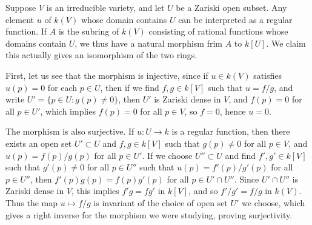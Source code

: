\begin{example}
    Suppose $V$ is an irreducible variety, and let $U$ be a Zariski open subset. Any element $u$ of $k(V)$ whose domain contains $U$ can be interpreted as a regular function. If $A$ is the subring of $k(V)$ consisting of rational functions whose domains contain $U$, we thus have a natural morphism frim $A$ to $k[U]$. We claim this actually gives an isomorphism of the two rings.

    First, let us see that the morphism is injective, since if $u \in k(V)$ satisfies $u(p) = 0$ for each $p \in U$, then if we find $f,g \in k[V]$ such that $u = f/g$, and write $U' = \{ p \in U : g(p) \neq 0 \}$, then $U'$ is Zariski dense in $V$, and $f(p) = 0$ for all $p \in U'$, which implies $f(p) = 0$ for all $p \in V$, so $f = 0$, hence $u = 0$.

    The morphism is also surjective. If $u : U \to k$ is a regular function, then there exists an open set $U' \subset U$ and $f,g \in k[V]$ such that $g(p) \neq 0$ for all $p \in V$, and $u(p) = f(p)/g(p)$ for all $p \in U'$. If we choose $U'' \subset U$ and find $f',g' \in k[V]$ such that $g'(p) \neq 0$ for all $p \in U''$ such that $u(p) = f'(p)/g'(p)$ for all $p \in U''$, then $f'(p)g(p) = f(p)g'(p)$ for all $p \in U' \cap U''$. Since $U' \cap U''$ is Zariski dense in $V$, this implies $f'g = fg'$ in $k[V]$, and so $f'/g' = f/g$ in $k(V)$. Thus the map $u \mapsto f/g$ is invariant of the choice of open set $U'$ we choose, which gives a right inverse for the morphism we were studying, proving surjectivity.
\end{example}

